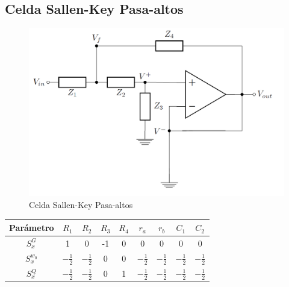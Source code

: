 \documentclass[../tc_tpfinal_main.tex]{subfiles}
\begin{document}
\subsection{Celda Sallen-Key Pasa-altos}
\begin{figure}[H]	
	\centering
	\includegraphics[scale=0.5]{imagenes/sallen_key_circ.png}
	\caption{Celda Sallen-Key Pasa-altos}
	\label{fig:tpfinal_sallen_key_circ}
\end{figure}
 	\begin{table}[H] 
				\centering
 				\begin{tabular}{||c c c c c c c c c||} 
 					\hline
				  Parámetro& $R_1$ & $R_2$ & $R_3$ & $R_4$ & $r_a$ & $r_b$&$C_1$&$C_2$\\ [0.5ex] 
 					\hline\hline
					 $S^G_x$& 1 & 0& -1& 0&0&0&0&0\\
					 $S^{w_0}_x$& $- \frac{1}{2}$ &$- \frac{1}{2}$& 0& 0&$- \frac{1}{2}$&$- \frac{1}{2}$&$- \frac{1}{2}$&$- \frac{1}{2}$\\
					 $S^{Q}_x$&$- \frac{1}{2}$ &$- \frac{1}{2}$& 0& 1&$- \frac{1}{2}$&$- \frac{1}{2}$&$- \frac{1}{2}$&$- \frac{1}{2}$\\[1ex] 
					\hline
				\end{tabular}
			\end{table}
\end{document}
